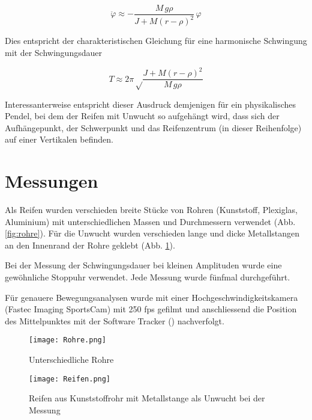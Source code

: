 \documentclass[11pt,a4paper]{article} %
\begin{document}
\begin{equation}\label{eq:chareq}
\ddot\varphi \approx -\frac{M\,g\rho}{J+M(r-\rho)^2}\,\varphi
\end{equation}

Dies entspricht der charakteristischen Gleichung für eine harmonische Schwingung mit der Schwingungsdauer

\begin{equation}\label{eq:T}
T\approx2\pi\sqrt\frac{J+M(r-\rho)^2}{M\,g\rho}
\end{equation}

Interessanterweise entspricht dieser Ausdruck demjenigen für ein physikalisches Pendel, bei dem der Reifen mit Unwucht so aufgehängt wird, dass sich der Aufhängepunkt, der Schwerpunkt und das Reifenzentrum (in dieser Reihenfolge) auf einer Vertikalen befinden.

\section{Messungen}

Als Reifen wurden verschieden breite Stücke von Rohren (Kunststoff, Plexiglas, Aluminium) mit unterschiedlichen Massen und Durchmessern verwendet (Abb. \ref{fig:rohre}). Für die Unwucht wurden verschieden lange und dicke Metallstangen an den Innenrand der Rohre geklebt (Abb. \ref{fig:reifen}). 

Bei der Messung der Schwingungsdauer bei kleinen Amplituden wurde eine gewöhnliche Stoppuhr verwendet. Jede Messung wurde fünfmal durchgeführt.

Für genauere Bewegungsanalysen wurde mit einer Hochgeschwindigkeitskamera (Fastec Imaging SportsCam) mit 250 fps gefilmt und anschliessend die Position des Mittelpunktes mit der Software Tracker (\cite{Tracker}) nachverfolgt.

\begin{figure}[H]

\begin{minipage}{0.45\linewidth}
\texttt{[image: Rohre.png]}
\caption{Unterschiedliche Rohre}
\label{fig:rohre}
\end{minipage}
\quad
\begin{minipage}{0.45\linewidth}
\texttt{[image: Reifen.png]}
\caption{Reifen aus Kunststoffrohr mit Metallstange als Unwucht bei der Messung}
\label{fig:reifen}
\end{minipage}

\end{figure}
\end{document}
